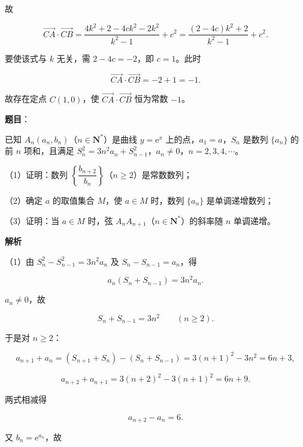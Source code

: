 \begin{answer}
故

\nopagebreak[4]
\[\overrightarrow{CA}\cdot\overrightarrow{CB}
=\frac{4k^2+2-4ck^2-2k^2}{k^2-1}+c^2
=\frac{(2-4c)k^2+2}{k^2-1}+c^2.\]

要使该式与 $k$ 无关，需 $2-4c=-2$，即 $c=1$。此时

\nopagebreak[4]
\[\overrightarrow{CA}\cdot\overrightarrow{CB}=-2+1=-1.\]

故存在定点 $C(1,0)$，使 $\overrightarrow{CA}\cdot\overrightarrow{CB}$ 恒为常数 $-1$。


\end{answer}
\begin{answer}

\textbf{题目}：

已知 $A_n(a_n,b_n)$（$n\in\mathbf N^*$）是曲线 $y=\mathrm e^x$ 上的点，$a_1=a$，$S_n$ 是数列 $\{a_n\}$ 的前 $n$ 项和，且满足 $S_n^2=3n^2a_n+S_{n-1}^2$，$a_n\neq0$，$n=2,3,4,\cdots$。

（1）证明：数列 $\left\{\dfrac{b_{n+2}}{b_n}\right\}$（$n\geqslant2$）是常数数列；

（2）确定 $a$ 的取值集合 $M$，使 $a\in M$ 时，数列 $\{a_n\}$ 是单调递增数列；

（3）证明：当 $a\in M$ 时，弦 $A_nA_{n+1}$（$n\in\mathbf N^*$）的斜率随 $n$ 单调递增。

\textbf{解析}

（1）由 $S_n^2-S_{n-1}^2=3n^2a_n$ 及 $S_n-S_{n-1}=a_n$，得

\nopagebreak[4]
\[a_n(S_n+S_{n-1})=3n^2a_n.\]

$a_n\neq0$，故

\nopagebreak[4]
\[S_n+S_{n-1}=3n^2\qquad(n\geqslant2).\]

于是对 $n\geqslant2$：

\nopagebreak[4]
\[a_{n+1}+a_n=(S_{n+1}+S_n)-(S_n+S_{n-1})=3(n+1)^2-3n^2=6n+3,\]

\nopagebreak[4]
\[a_{n+2}+a_{n+1}=3(n+2)^2-3(n+1)^2=6n+9.\]

两式相减得

\nopagebreak[4]
\[a_{n+2}-a_n=6.\]

又 $b_n=\mathrm e^{a_n}$，故


\end{answer}
